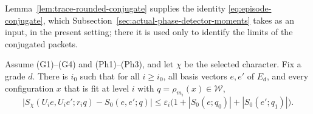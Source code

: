Lemma~\ref{lem:trace-rounded-conjugate} supplies the identity
\eqref{eq:episode-conjugate}, which
Subsection~\ref{sec:actual-phase-detector-moments} takes as an input, in
the present setting; there it is used only to identify the limits of the
conjugated packets.

\begin{proposition}
\label{prop:trace-rounded-comparison}
Assume (G1)--(G4) and (Ph1)--(Ph3), and let $\chi$ be the selected
character. Fix a grade $d$. There is $i_0$ such that for all $i\ge i_0$,
all basis vectors $e,e'$ of $E_d$, and every configuration $x$ that is fit
at level $i$ with $q=\rho_{m_i}(x)\in\mathcal W$,
\begin{equation}\label{eq:trace-rounded-comparison}
 \bigl|S_\chi(U_ie,U_ie';r_iq)-S_0(e,e';q)\bigr|
 \le\varepsilon_i\bigl(1+|S_0(e;q_0)|+|S_0(e';q_1)|\bigr).
\end{equation}
\end{proposition}
